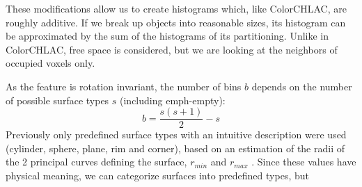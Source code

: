 \documentclass[conference]{sty/IEEEtran}
\begin{document}
These modifications allow us to create histograms which, like ColorCHLAC, are roughly additive.
If we break up objects into reasonable sizes, its histogram can be approximated by the sum of the
histograms of its partitioning. Unlike in ColorCHLAC, free space is considered, but we are looking
at the neighbors of occupied voxels only.

As the feature is rotation invariant, the number of bins $b$ depends on the number of possible surface types $s$ (including emph-empty):
\begin{equation}
b=\frac{s(s+1)}{2}-s
\end{equation}
Previously only predefined surface types with an intuitive description were used (cylinder, sphere, plane, rim and corner),
based on an estimation of the radii of the 2 principal curves defining the surface, $r_{min}$ and $r_{max}$ \cite{Marton10IROS}.
Since these values have physical meaning, we can categorize surfaces into predefined types, but
\end{document}
